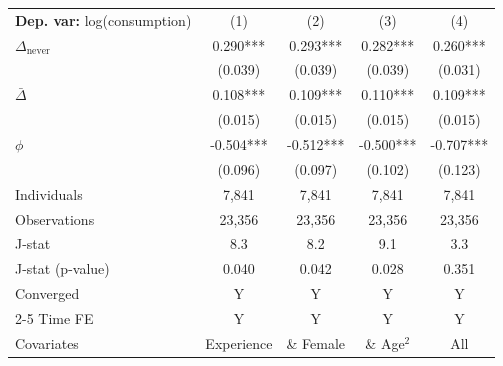 \begin{tabular}{l cccc} \toprule  \textbf{Dep. var:}  log(consumption) 
                    &\multicolumn{1}{c}{(1)}   &\multicolumn{1}{c}{(2)}   &\multicolumn{1}{c}{(3)}   &\multicolumn{1}{c}{(4)}   \\

\addlinespace
$\Delta_{\text{never}}$&       0.290***&       0.293***&       0.282***&       0.260***\\
                    &     (0.039)   &     (0.039)   &     (0.039)   &     (0.031)   \\

\addlinespace
$\bar{\Delta}$      &       0.108***&       0.109***&       0.110***&       0.109***\\
                    &     (0.015)   &     (0.015)   &     (0.015)   &     (0.015)   \\

\addlinespace
$\phi$              &      -0.504***&      -0.512***&      -0.500***&      -0.707***\\
                    &     (0.096)   &     (0.097)   &     (0.102)   &     (0.123)   \\
\addlinespace
Individuals         &       7,841   &       7,841   &       7,841   &       7,841   \\
Observations        &      23,356   &      23,356   &      23,356   &      23,356   \\
J-stat              &         8.3   &         8.2   &         9.1   &         3.3   \\
J-stat (p-value)    &       0.040   &       0.042   &       0.028   &       0.351   \\
Converged           &           Y   &           Y   &           Y   &           Y   \\
\cmidrule{2-5} Time FE & Y & Y & Y & Y \\ Covariates & Experience & \& Female & \& Age$^2$ & All \\ \bottomrule \end{tabular}
